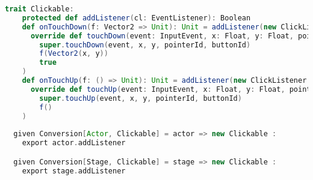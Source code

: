 \begin{lstlisting}[language=Scala, label=code:clickable, caption=trait Clickable]
  trait Clickable:
    protected def addListener(cl: EventListener): Boolean
    def onTouchDown(f: Vector2 => Unit): Unit = addListener(new ClickListener :
      override def touchDown(event: InputEvent, x: Float, y: Float, pointerId: Int, buttonId: Int): Boolean =
        super.touchDown(event, x, y, pointerId, buttonId)
        f(Vector2(x, y))
        true
    )
    def onTouchUp(f: () => Unit): Unit = addListener(new ClickListener :
      override def touchUp(event: InputEvent, x: Float, y: Float, pointerId: Int, buttonId: Int): Unit =
        super.touchUp(event, x, y, pointerId, buttonId)
        f()
    )
    
  given Conversion[Actor, Clickable] = actor => new Clickable :
    export actor.addListener

  given Conversion[Stage, Clickable] = stage => new Clickable :
    export stage.addListener
\end{lstlisting}